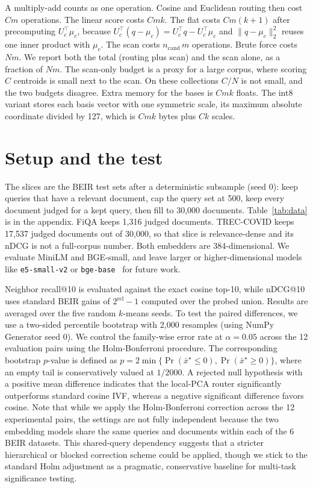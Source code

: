 \documentclass[sigconf,nonacm]{acmart}
\begin{document}
A multiply-add counts as one operation. Cosine and Euclidean routing then cost $Cm$ operations. The linear score costs $Cmk$. The flat costs $Cm(k+1)$ after precomputing $U_c^\top\mu_c$, because $U_c^\top(q-\mu_c) = U_c^\top q - U_c^\top\mu_c$ and $\|q-\mu_c\|_2^2$ reuses one inner product with $\mu_c$. The scan costs $n_{\mathrm{cand}}\, m$ operations. Brute force costs $Nm$. We report both the total (routing plus scan) and the scan alone, as a fraction of $Nm$. The scan-only budget is a proxy for a large corpus, where scoring $C$ centroids is small next to the scan. On these collections $C/N$ is not small, and the two budgets disagree. Extra memory for the bases is $Cmk$ floats. The int8 variant stores each basis vector with one symmetric scale, its maximum absolute coordinate divided by 127, which is $Cmk$ bytes plus $Ck$ scales.

\section{Setup and the test}
\label{sec:setup}

The slices are the BEIR test sets after a deterministic subsample (seed 0): keep queries that have a relevant document, cap the query set at 500, keep every document judged for a kept query, then fill to 30{,}000 documents. Table~\ref{tab:data} is in the appendix. FiQA keeps 1{,}316 judged documents. TREC-COVID keeps 17{,}537 judged documents out of 30{,}000, so that slice is relevance-dense and its nDCG is not a full-corpus number. Both embedders are 384-dimensional. We evaluate MiniLM and BGE-small, and leave larger or higher-dimensional models like \texttt{e5-small-v2} or \texttt{bge-base}~\cite{wang2022e5} for future work.

Neighbor recall@10 is evaluated against the exact cosine top-10, while nDCG@10 uses standard BEIR gains of $2^{\mathrm{rel}}-1$ computed over the probed union. Results are averaged over the five random $k$-means seeds. To test the paired differences, we use a two-sided percentile bootstrap with 2,000 resamples (using NumPy Generator seed 0). We control the family-wise error rate at $\alpha = 0.05$ across the 12 evaluation pairs using the Holm-Bonferroni procedure. The corresponding bootstrap $p$-value is defined as $p = 2\min\{\Pr(\bar{x}^\star \le 0), \Pr(\bar{x}^\star \ge 0)\}$, where an empty tail is conservatively valued at $1/2000$. A rejected null hypothesis with a positive mean difference indicates that the local-PCA router significantly outperforms standard cosine IVF, whereas a negative significant difference favors cosine. Note that while we apply the Holm-Bonferroni correction across the 12 experimental pairs, the settings are not fully independent because the two embedding models share the same queries and documents within each of the 6 BEIR datasets. This shared-query dependency suggests that a stricter hierarchical or blocked correction scheme could be applied, though we stick to the standard Holm adjustment as a pragmatic, conservative baseline for multi-task significance testing.
\end{document}
